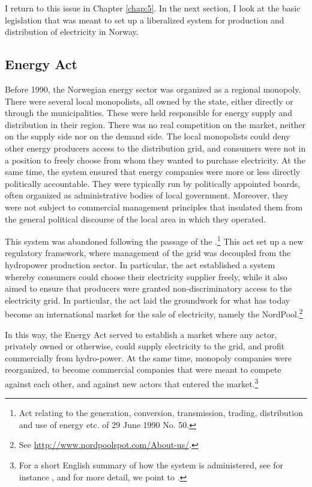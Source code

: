 I return to this issue in Chapter \ref{chap:5}. In the next section, I look at the basic legislation that was meant to set up a liberalized system for production and distribution of electricity in Norway.

\subsection{Energy Act}\label{sec:ea}

Before 1990, the Norwegian energy sector was organized as a regional monopoly. There were several local monopolists, all owned by the state, either directly or through the municipalities. These were held responsible for energy supply and distribution in their region. There was no real competition on the market, neither on the supply side nor on the demand side. The local monopolists could deny other energy producers access to the distribution grid, and consumers were not in a position to freely choose from whom they wanted to purchase electricity. At the same time, the system ensured that energy companies were more or less directly politically accountable. They were typically run by politically appointed boards, often organized as administrative bodies of local government. Moreover, they were not subject to commercial management principles that insulated them from the general political discourse of the local area in which they operated.

This system was abandoned following the passage of the \cite{ea90}.\footnote{Act relating to the generation, conversion, transmission, trading, distribution and use of energy etc. of 29 June 1990 No. 50.} This act set up a new regulatory framework, where management of the grid was decoupled from the hydropower production sector. In particular, the act established a system whereby consumers could choose their electricity supplier freely, while it also aimed to ensure that producers were granted non-discriminatory access to the electricity grid. In particular, the act laid the groundwork for what has today become an international market for the sale of electricity, namely the NordPool.\footnote{See \url{http://www.nordpoolspot.com/About-us/}.}

In this way, the Energy Act served to establish a market where any actor, privately owned or otherwise, could supply electricity to the grid, and profit commercially from hydro-power. At the same time, monopoly companies were reorganized, to become commercial companies that were meant to compete against each other, and against new actors that entered the market.\footnote{For a short English summary of how the system is administered, see for instance \cite[p.29-30]{ar2010}, and for more detail, we point to \cite{Hammer2}.}

